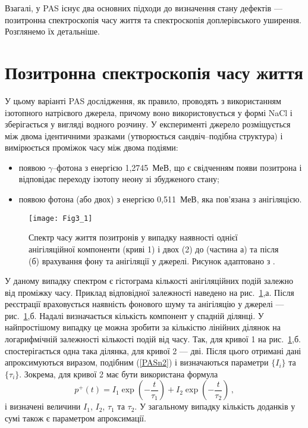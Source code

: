 Взагалі, у PAS існує два основних підходи до визначення стану дефектів ---позитронна спектроскопія часу життя
та спектроскопія доплерівського уширення.
Розглянемо їх детальніше.

\section{Позитронна спектроскопія часу життя}\label{secPAS_PSLT}
У цьому варіанті PAS дослідження, як правило, проводять з використанням ізотопного натрієвого джерела,
причому воно використовується у формі NaCl і зберігається у вигляді водного розчину.
У експерименті джерело розміщується між двома ідентичними зразками
(утворюється сандвіч--подібна структура) і
вимірюється проміжок часу між двома подіями:
\begin{itemize}[leftmargin=0em,itemindent=1.5em]
\item появою $\gamma$--фотона з енергією 1,2745~МеВ, що є свідченням появи позитрона і відповідає переходу ізотопу неону зі збудженого стану;
\item появою фотона (або двох) з енергією 0,511~МеВ, яка пов'язана з анігіляцією.
\end{itemize}

\begin{figure}[b]
\center
\vspace{-2mm}
\texttt{[image: Fig3\_1]}
\vspace{-3mm}
\caption{Спектр часу життя позитронів у випадку наявності однієї анігіляційної компоненти
(криві 1) і двох (2) до (частина а) та після (б) врахування фону та
анігіляції у джерелі.
Рисунок адаптовано з \cite{PAS}.}
\vspace{-3mm}
\label{F31}
\end{figure}

У даному випадку спектром є гістограма кількості анігіляційних подій залежно від проміжку часу.
Приклад відповідної залежності наведено на рис.~\ref{F31},а.
Після реєстрації враховується наявність фонового шуму та анігіляцію у джерелі --- рис.~\ref{F31},б.
Надалі визначається кількість компонент у спадній ділянці.
У найпростішому випадку це можна зробити за кількістю лінійних ділянок на логарифмічній залежності
кількості подій від часу.
Так, для кривої 1 на рис.~\ref{F31},б. спостерігається одна така ділянка,
для кривої 2 --- дві.
Після цього отримані дані апроксимуються виразом, подібним (\ref{PASn2}) і визначаються параметри $\{I_i\}$ та $\{\tau_i\}$.
Зокрема, для кривої 2 має бути використана формула
\begin{equation*}
p^+(t)=I_1\exp\left(-\frac{t}{\tau_1}\right)+I_2\exp\left(-\frac{t}{\tau_2}\right)\,,
\end{equation*}
і визначені величини $I_1$, $I_2$, $\tau_1$ та $\tau_2$.
У загальному випадку кількість доданків у сумі також є параметром апроксимації.

